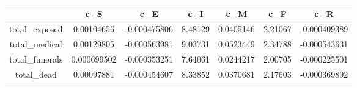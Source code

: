 \begin{tabular}{|c|c|c|c|c|c|c|}
\hline
& c_S & c_E & c_I & c_M & c_F & c_R \\
\hline
total_exposed & 0.00104656 & -0.000475806 & 8.48129 & 0.0405146 & 2.21067 & -0.000409389 \\
\hline
total_medical & 0.00129805 & -0.000563981 & 9.03731 & 0.0523449 & 2.34788 & -0.000543631 \\
\hline
total_funerals & 0.000699502 & -0.000353251 & 7.64061 & 0.0244217 & 2.00705 & -0.000225501 \\
\hline
total_dead & 0.00097881 & -0.000454607 & 8.33852 & 0.0370681 & 2.17603 & -0.000369892 \\
\hline
\end{tabular}
